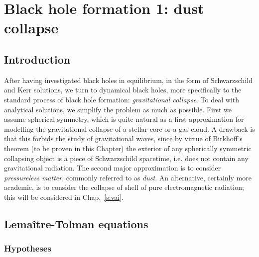 \chapter{Black hole formation 1: dust collapse}
\label{s:lem}

\minitoc

\section{Introduction}

After having investigated black holes in equilibrium, in the form of
Schwarzschild and Kerr solutions, we turn to dynamical black holes,
more specifically to the standard process of
black hole formation: \emph{gravitational collapse}.
To deal with analytical solutions, we simplify the problem as much as
possible. First we assume spherical symmetry, which is quite natural
as a first approximation for modelling the gravitational collapse
of a stellar core or a gas cloud. A drawback is that this forbids the
study of gravitational waves, since by
virtue of Birkhoff's theorem (to be proven in this Chapter)
the exterior
of any spherically symmetric collapsing object is a piece of Schwarzschild
spacetime, i.e. does not contain any gravitational radiation.
The second major approximation is to consider \emph{pressureless matter},
commonly referred to as \emph{dust}.
An alternative, certainly more academic, is to consider the collapse of shell of pure electromagnetic radiation; this will be considered in Chap.~\ref{s:vai}.

\section{Lemaître-Tolman equations}

\subsection{Hypotheses} \label{s:lem:hyp}

